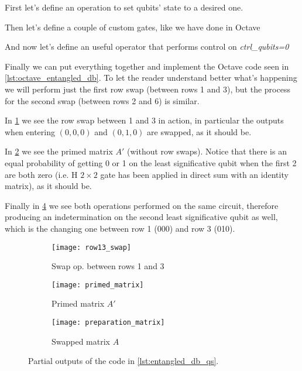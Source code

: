 \noindent First let's define an operation to set qubits' state to a desired one.



\noindent Then let's define a couple of custom gates, like we have done in Octave



\noindent And now let's define an useful operator that performs control on \textit{ctrl\_qubits=0}



\noindent Finally we can put everything together and implement the Octave code seen in \cref{lst:octave_entangled_db}. To let the reader understand better what's happening we will perform just the first row swap (between rows 1 and 3), but the process for the second swap (between rows 2 and 6) is similar.



In \cref{fig:row13_swap} we see the row swap between 1 and 3 in action, in particular the outputs when entering $(0,0,0)$ and $(0,1,0)$ are swapped, as it should be.

In \cref{fig:primed_matrix} we see the primed matrix $A'$ (without row swaps). Notice that there is an equal probability of getting 0 or 1 on the least significative qubit when the first 2 are both zero (i.e. H $2 \times 2$ gate has been applied in direct sum with an identity matrix), as it should be.

Finally in \cref{fig:preparation_matrix} we see both operations performed on the same circuit, therefore producing an indetermination on the second least significative qubit as well, which is the changing one between row 1 (000) and row 3 (010).

\begin{figure}
	\centering
	\begin{subfigure}{0.49\linewidth}
		\centering
		\texttt{[image: row13\_swap]}
		\caption{Swap op. between rows 1 and 3}
		\label{fig:row13_swap}
	\end{subfigure}
	\begin{subfigure}{0.49\linewidth}
		\centering
		\texttt{[image: primed\_matrix]}
		\caption{Primed matrix $A'$}
		\label{fig:primed_matrix}
	\end{subfigure}
	
	\bigskip
	
	\begin{subfigure}{0.5\linewidth}
		\centering
		\texttt{[image: preparation\_matrix]}
		\caption{Swapped matrix $A$}
		\label{fig:preparation_matrix}
	\end{subfigure}
	
	\caption{Partial outputs of the code in \cref{lst:entangled_db_qs}.}
\end{figure}